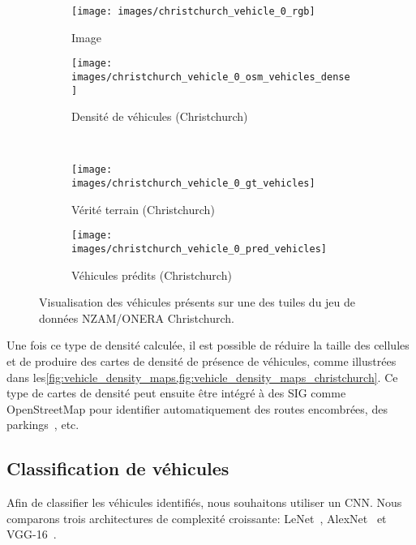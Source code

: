 \begin{figure}[h]
  \centering
  \begin{subfigure}{0.35\textwidth}
    \texttt{[image: images/christchurch\_vehicle\_0\_rgb]}
    \caption{Image }
  \end{subfigure}
  \hspace{0.1\textwidth}
  \begin{subfigure}{0.35\textwidth}
    \texttt{[image: images/christchurch\_vehicle\_0\_osm\_vehicles\_dense]}
    \caption{Densité de véhicules (Christchurch)}
  \end{subfigure}\\
  \begin{subfigure}{0.35\textwidth}
    \texttt{[image: images/christchurch\_vehicle\_0\_gt\_vehicles]}
    \caption{Vérité terrain (Christchurch)}
  \end{subfigure}
  \hspace{0.1\textwidth}
  \begin{subfigure}{0.35\textwidth}
    \texttt{[image: images/christchurch\_vehicle\_0\_pred\_vehicles]}
    \caption{Véhicules prédits (Christchurch)}
  \end{subfigure}
  \caption{Visualisation des véhicules présents sur une des tuiles du jeu de données NZAM/ONERA Christchurch.}
  \label{fig:vehicle_density_maps_christchurch}
\end{figure}

Une fois ce type de densité calculée, il est possible de réduire la taille des cellules et de produire des cartes de densité de présence de véhicules, comme illustrées dans les\cref{fig:vehicle_density_maps,fig:vehicle_density_maps_christchurch}. Ce type de cartes de densité peut ensuite être intégré à des \gls{SIG} comme OpenStreetMap pour identifier automatiquement des routes encombrées, des parkings~\cite{kamenetsky_aerial_2015}, etc.

\subsection{Classification de véhicules}

Afin de classifier les véhicules identifiés, nous souhaitons utiliser un \gls{CNN}. Nous comparons trois architectures de complexité croissante: LeNet~\cite{lecun_gradient-based_1998}, AlexNet~\cite{krizhevsky_imagenet_2012} et VGG-16~\cite{simonyan_very_2014}.

